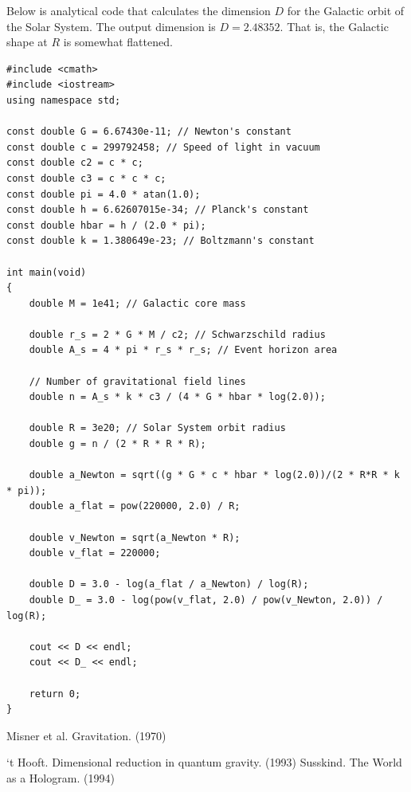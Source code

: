 \documentclass[12pt]{article}
\begin{document}
Below is analytical code that calculates the dimension $D$ for the Galactic orbit of the Solar System.
The output dimension is $D = 2.48352$.
That is, the Galactic shape at $R$ is somewhat flattened.
\begin{lstlisting}
#include <cmath>
#include <iostream>
using namespace std;

const double G = 6.67430e-11; // Newton's constant
const double c = 299792458; // Speed of light in vacuum
const double c2 = c * c;
const double c3 = c * c * c;
const double pi = 4.0 * atan(1.0);
const double h = 6.62607015e-34; // Planck's constant
const double hbar = h / (2.0 * pi);
const double k = 1.380649e-23; // Boltzmann's constant

int main(void)
{
	double M = 1e41; // Galactic core mass

	double r_s = 2 * G * M / c2; // Schwarzschild radius
	double A_s = 4 * pi * r_s * r_s; // Event horizon area

	// Number of gravitational field lines
	double n = A_s * k * c3 / (4 * G * hbar * log(2.0)); 

	double R = 3e20; // Solar System orbit radius
	double g = n / (2 * R * R * R);

	double a_Newton = sqrt((g * G * c * hbar * log(2.0))/(2 * R*R * k * pi));
	double a_flat = pow(220000, 2.0) / R;

	double v_Newton = sqrt(a_Newton * R);
	double v_flat = 220000;

	double D = 3.0 - log(a_flat / a_Newton) / log(R);
	double D_ = 3.0 - log(pow(v_flat, 2.0) / pow(v_Newton, 2.0)) / log(R);

	cout << D << endl;
	cout << D_ << endl;

	return 0;
}
\end{lstlisting}













\begin{thebibliography}{9}

 Misner et al. Gravitation. (1970)

 `t Hooft. Dimensional reduction in quantum gravity. (1993)
 Susskind. The World as a Hologram. (1994)








\end{thebibliography}
\end{document}
